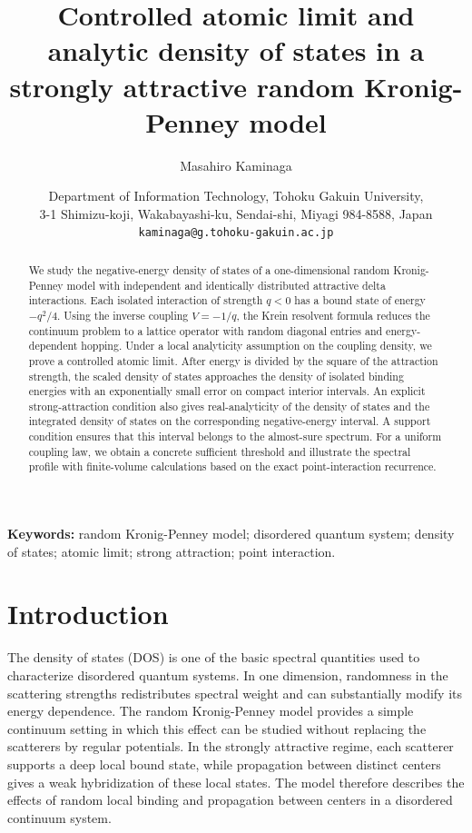 \documentclass[12pt,a4paper]{article}
\numberwithin{equation}{section}
\newcommand{\email}[1]{\texttt{#1}}
\newcommand{\address}[1]{\date{#1}}
\newcommand{\keywords}[1]{\par\medskip\noindent\textbf{Keywords: }#1\par}
\begin{document}
\title{Controlled atomic limit and analytic density of states in a strongly attractive random Kronig-Penney model}
\author{Masahiro Kaminaga}
\address{Department of Information Technology, Tohoku Gakuin University,\\
3-1 Shimizu-koji, Wakabayashi-ku, Sendai-shi, Miyagi 984-8588, Japan\\
\email{kaminaga@g.tohoku-gakuin.ac.jp}}
\maketitle

\begin{abstract}
We study the negative-energy density of states of a one-dimensional random
Kronig-Penney model with independent and identically distributed attractive
delta interactions.  Each isolated interaction of strength $q<0$ has a bound
state of energy $-q^2/4$.  Using the inverse coupling $V=-1/q$, the Krein
resolvent formula reduces the continuum problem to a lattice operator with
random diagonal entries and energy-dependent hopping.  Under a local
analyticity assumption on the coupling density, we prove a controlled atomic
limit.  After energy is divided by the square of the attraction strength,
the scaled density of states approaches the density of isolated binding
energies with an exponentially small error on compact interior intervals.
An explicit strong-attraction condition also gives real-analyticity of the
density of states and the integrated density of states on the corresponding
negative-energy interval.  A support condition ensures that this interval
belongs to the almost-sure spectrum.  For a uniform coupling law, we obtain a
concrete sufficient threshold and illustrate the spectral profile with
finite-volume calculations based on the exact point-interaction recurrence.
\end{abstract}

\keywords{random Kronig-Penney model; disordered quantum system; density of states;
atomic limit; strong attraction; point interaction.}

\section{Introduction}\label{sec:intro}

The density of states (DOS) is one of the basic spectral quantities used to
characterize disordered quantum systems.  In one dimension, randomness in the
scattering strengths redistributes spectral weight and can substantially
modify its energy dependence.  The random Kronig-Penney model provides a
simple continuum setting in which this effect can be studied without
replacing the scatterers by regular potentials.  In the strongly attractive
regime, each scatterer supports a deep local bound state, while propagation
between distinct centers gives a weak hybridization of these local states.
The model therefore describes the effects of random local binding and
propagation between centers in a disordered continuum system.
\end{document}
